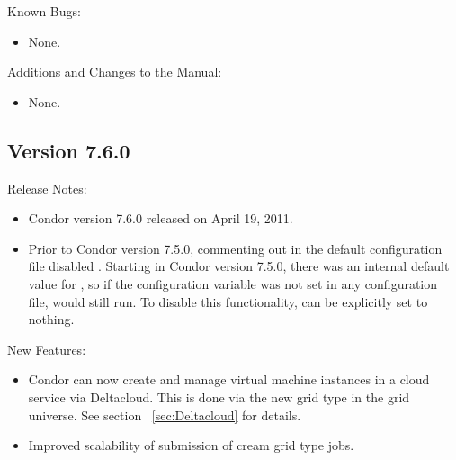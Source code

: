 \noindent Known Bugs:

\begin{itemize}

\item None.

\end{itemize}

\noindent Additions and Changes to the Manual:

\begin{itemize}

\item None.

\end{itemize}


\subsection*{\label{sec:New-7-6-0}Version 7.6.0}

\noindent Release Notes:

\begin{itemize}

\item Condor version 7.6.0 released on April 19, 2011.

\item Prior to Condor version 7.5.0, commenting out  in the
  default configuration file disabled .  
  Starting in Condor version 7.5.0,
  there was an internal default value for , so if
  the configuration variable was not set in any configuration file,
   would still run.
  To disable this functionality,  can be explicitly set to
  nothing.

\end{itemize}


\noindent New Features:

\begin{itemize}

\item Condor can now create and manage virtual machine instances in a
cloud service via Deltacloud. This is done via the new
 grid type in the grid universe.
See section ~\ref{sec:Deltacloud} for details.

\item Improved scalability of submission of cream grid type jobs.

\end{itemize}

